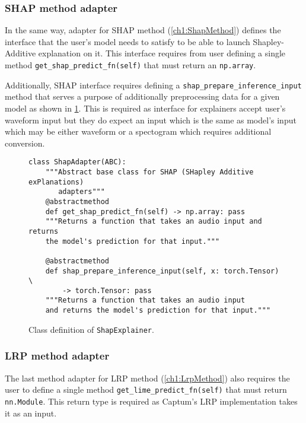 \documentclass[
    bindingoffset=5mm,  %
    footnoteindent=3mm, %
    hyphenation=true    %
]{src/wut-thesis}
\begin{document}
\subsubsection{SHAP method adapter}

    In the same way, adapter for SHAP method (\ref{ch1:ShapMethod}) defines the interface that the user's model needs to satisfy to be able to launch Shapley-Additive explanation on it.
    This interface requires from user defining a single method \texttt{get_shap_predict_fn(self)}
    that must return an \texttt{np.array}.

    Additionally, SHAP interface requires defining a \texttt{shap_prepare_inference_input} method that serves a purpose of additionally preprocessing data for a given model as shown in \ref{fig:ShapAdapter}.
    This is required as interface for explainers accept user's waveform input but they do expect an input which is the same as model's input which may be either waveform or a spectogram which requires additional conversion.

\begin{figure}%
\begin{verbatim}
class ShapAdapter(ABC):
    """Abstract base class for SHAP (SHapley Additive exPlanations)
       adapters"""
    @abstractmethod
    def get_shap_predict_fn(self) -> np.array: pass
    """Returns a function that takes an audio input and returns
    the model's prediction for that input."""

    @abstractmethod
    def shap_prepare_inference_input(self, x: torch.Tensor) \
        -> torch.Tensor: pass
    """Returns a function that takes an audio input
    and returns the model's prediction for that input."""
\end{verbatim}
\caption{Class definition of \texttt{ShapExplainer}.}
\label{fig:ShapAdapter}
\end{figure}

\subsubsection{LRP method adapter}

    The last method adapter for LRP method (\ref{ch1:LrpMethod}) also requires the user to define a single method \texttt{get_lime_predict_fn(self)} that must return \texttt{nn.Module}. This return type is required as Captum's LRP implementation takes it as an input.
\end{document}
